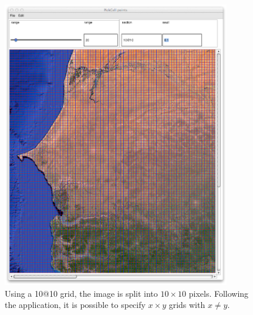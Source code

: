\begin{figure}[hbtp]
\begin{center} 
\includegraphics[width=10cm]{SenegalGrid10x10.png}
\caption{Using a 10@10 grid, the image is split into $10\times10$ pixels. 
Following the application, it is possible to specify $x  \times   y$ grids with $x  \neq  y$.}
\label{fig:SenegalGrid10x10}
\end{center}
\end{figure}


